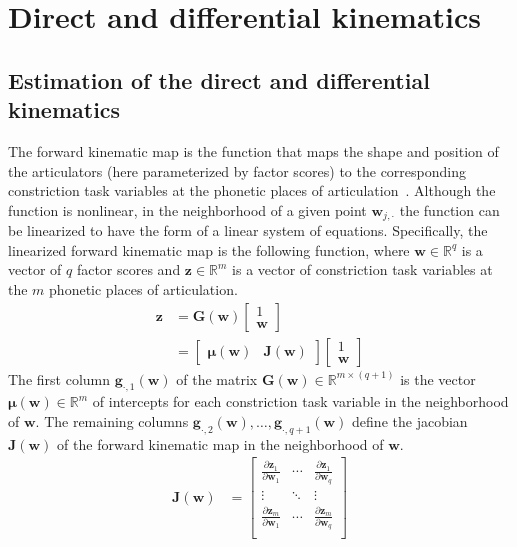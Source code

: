 \documentclass[reprint]{JASAnew}\usepackage[]{graphicx}\usepackage[]{color}
\begin{document}
\section{Direct and differential kinematics}
\label{sec:forwardkinematicmap}

\subsection{Estimation of the direct and differential kinematics}

The forward kinematic map is the function that maps the shape and position of the articulators (here parameterized by factor scores) to the corresponding constriction task variables at the phonetic places of articulation~\citep{lammert2013statistical}. 
%
Although the function is nonlinear, in the neighborhood of a given point $\mathbf{w}_{j,\cdot}$ the function can be linearized to have the form of a linear system of equations.
%
Specifically, the linearized forward kinematic map is the following function, where $\mathbf{w} \in \mathbb{R}^q$ is a vector of $q$ factor scores and $\mathbf{z} \in \mathbb{R}^{m}$ is a vector of constriction task variables at the $m$ phonetic places of articulation.
%
\begin{align}
\mathbf{z} 
&= 
\mathbf{G}\left( \mathbf{w} \right) 
\left[ \begin{array}{c} 1 \\ \mathbf{w} \end{array} \right] \\
&= 
\left[ \begin{array}{cc} 
\boldsymbol{\mu}\left(\mathbf{w}\right) & \mathbf{J}\left(\mathbf{w}\right) 
\end{array} \right]
\left[ \begin{array}{c} 1 \\ \mathbf{w} \end{array} \right]
\end{align}
%
The first column $\mathbf{g}_{\cdot,1}(\mathbf{w})$ of the matrix $\mathbf{G}(\mathbf{w}) \in \mathbb{R}^{m\times (q+1)}$ is the vector $\boldsymbol{\mu}(\mathbf{w}) \in \mathbb{R}^m$ of intercepts for each constriction task variable in the neighborhood of $\mathbf{w}$. 
%
The remaining columns $\mathbf{g}_{\cdot,2}(\mathbf{w}), \ldots, \mathbf{g}_{\cdot,q+1}(\mathbf{w})$ define the jacobian $\mathbf{J}(\mathbf{w})$ of the forward kinematic map in the neighborhood of $\mathbf{w}$. 
% 
\begin{align}
\mathbf{J}(\mathbf{w}) 
&=
\left[ \begin{array}{ccc} 
\frac{\partial \mathbf{z}_1}{\partial \mathbf{w}_1} & \cdots & \frac{\partial \mathbf{z}_1}{\partial \mathbf{w}_q} \\
\vdots & \ddots & \vdots \\
\frac{\partial \mathbf{z}_m}{\partial \mathbf{w}_1} & \cdots & \frac{\partial \mathbf{z}_m}{\partial \mathbf{w}_q} \\
\end{array} \right]
\end{align}
\end{document}

